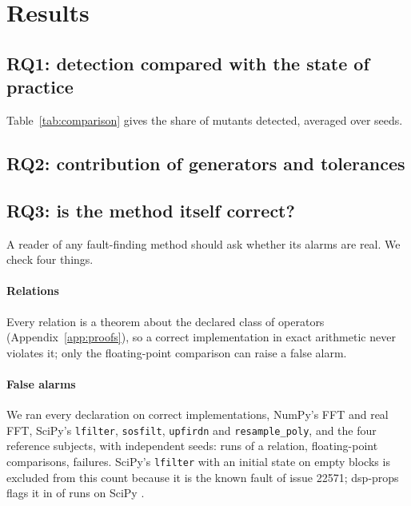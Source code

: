 \documentclass[10pt,conference]{IEEEtran}
\newcommand{\code}[1]{\texttt{#1}}
\begin{document}
\section{Results}
\label{sec:results}

\subsection{RQ1: detection compared with the state of practice}
\label{sec:rq1}



Table~\ref{tab:comparison} gives the share of mutants detected, averaged over
seeds. \rqOneText

\subsection{RQ2: contribution of generators and tolerances}
\label{sec:rq2}



\rqTwoText

\subsection{RQ3: is the method itself correct?}
\label{sec:rq3}

A reader of any fault-finding method should ask whether its alarms are real.
We check four things.

\paragraph*{Relations} Every relation is a theorem about the declared class of
operators (Appendix~\ref{app:proofs}), so a correct implementation in exact
arithmetic never violates it; only the floating-point comparison can raise a
false alarm.

\paragraph*{False alarms} We ran every declaration on correct implementations,
NumPy's FFT and real FFT, SciPy's \code{lfilter}, \code{sosfilt},
\code{upfirdn} and \code{resample\_poly}, and the four reference subjects, with
\fpSeeds{} independent seeds: \fpRuns{} runs of a relation, \fpComparisons{}
floating-point comparisons, \fpFailed{} failures. SciPy's \code{lfilter} with
an initial state on empty blocks is excluded from this count because it is the
known fault of issue 22571; dsp-props flags it in \knownBugFlagged{} of
\knownBugRuns{} runs on SciPy \scipyVersion.
\end{document}

